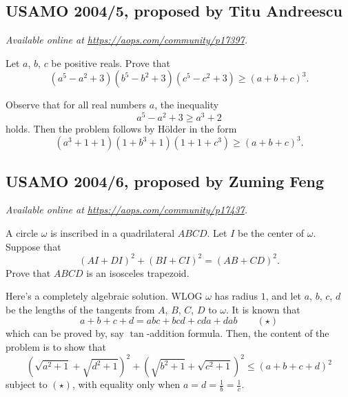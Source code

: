 \documentclass[11pt]{scrartcl}
\begin{document}
\subsection{USAMO 2004/5, proposed by Titu Andreescu}
\textsl{Available online at \url{https://aops.com/community/p17397}.}
\begin{mdframed}[style=mdpurplebox,frametitle={Problem statement}]
Let $a$, $b$, $c$ be positive reals.
Prove that
\[ ( a^5-a^2+3 )( b^5-b^2+3 )( c^5-c^2+3 )
  \ge \left( a+b+c \right)^3. \]
\end{mdframed}
Observe that for all real numbers $a$, the inequality
\[ a^5-a^2+3 \ge a^3+2 \]
holds.
Then the problem follows by H\"{o}lder in the form
\[ (a^3+1+1)(1+b^3+1)(1+1+c^3) \ge (a+b+c)^3. \]
\pagebreak

\subsection{USAMO 2004/6, proposed by Zuming Feng}
\textsl{Available online at \url{https://aops.com/community/p17437}.}
\begin{mdframed}[style=mdpurplebox,frametitle={Problem statement}]
A circle $\omega$ is inscribed in a quadrilateral $ABCD$.
Let $I$ be the center of $\omega$.
Suppose that \[ (AI + DI)^2 + (BI + CI)^2 = (AB + CD)^2.  \]
Prove that $ABCD$ is an isosceles trapezoid.
\end{mdframed}
Here's a completely algebraic solution.
WLOG $\omega$ has radius $1$, and let $a$, $b$, $c$, $d$ be the
lengths of the tangents from $A$, $B$, $C$, $D$ to $\omega$.
It is known that
\[ a+b+c+d = abc+bcd+cda+dab \qquad (\star) \]
which can be proved by, say $\tan$-addition formula.
Then, the content of the problem is to show that
\[
  (\sqrt{a^2+1}+\sqrt{d^2+1})^2
  + (\sqrt{b^2+1}+\sqrt{c^2+1})^2
  \le (a+b+c+d)^2
\]
subject to $(\star)$,
with equality only when $a=d=\tfrac1b=\tfrac1c$.
\end{document}
